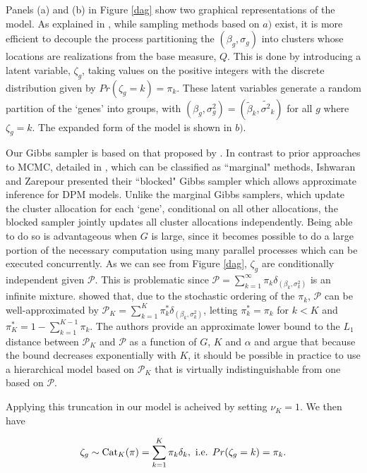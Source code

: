 {Panels (a) and (b) in Figure \ref{dag} show two graphical representations of the model. As explained in \cite{neal2000}, while sampling methods based on $a)$ exist, it is more efficient to decouple the process partitioning the $(\beta_g,\sigma_g)$ into clusters whose locations are realizations from the base measure, $Q$. This is done by introducing a latent variable, $\zeta_g$, taking values on the positive integers with the discrete distribution given by $Pr(\zeta_g=k)=\pi_k$. These latent variables generate a random partition of the `genes' into groups, with $(\beta_g,\sigma^2_g)=(\tilde{\beta}_k,\tilde{\sigma^2}_k)$ for all $g$ where $\zeta_g=k$. The expanded form of the model is shown in $b)$.

Our Gibbs sampler is based on that proposed by \citet{ishwaran2000}. In contrast to prior approaches to MCMC, detailed in \citet{neal2000}, which can be classified as ``marginal" methods, Ishwaran and Zarepour presented their ``blocked" Gibbs sampler which allows approximate inference for DPM models. Unlike the marginal Gibbs samplers, which update the cluster allocation for each
`gene', conditional on all other allocations, the blocked sampler jointly updates all cluster allocations independently. Being able to do so is advantageous when $G$ is large, since it becomes possible to do a large portion of the necessary computation using many parallel processes which can be executed concurrently. As we can see from Figure \ref{dag}, $\zeta_g$ are conditionally independent given $\mathcal{P}$. This is problematic since $\mathcal{P}=\sum_{k=1}^\infty \pi_k \delta_{(\beta_k,\sigma^2_k)}$ is an infinite mixture. \cite{ishwaran2001} showed that, due to the stochastic ordering of the $\pi_k$, $\mathcal{P}$ can be well-approximated by $\mathcal{P}_K=\sum_{k=1}^K \pi^*_k \delta_{(\beta_k,\sigma^2_k)}$, letting $\pi_k^*=\pi_k$ for $k<K$ and $\pi_K^* = 1-\sum_{k=1}^{K-1} \pi_k$. The authors provide an approximate lower bound to the $L_1$ distance between $\mathcal{P}_K$ and $\mathcal{P}$ as a function of $G$, $K$ and $\alpha$ and argue that because the bound decreases exponentially with $K$, it should be possible in practice to use a hierarchical model based on $\mathcal{P}_K$ that is virtually indistinguishable from one based on $\mathcal{P}$.

Applying this truncation in our model is acheived by setting $\nu_K=1$. We then have

\begin{equation*}
\zeta_g \sim \operatorname{Cat}_K(\pi) = \sum_{k=1}^K \pi_k \delta_{k}, \mbox{ i.e. } Pr(\zeta_g=k)=\pi_k.
\end{equation*}


}
